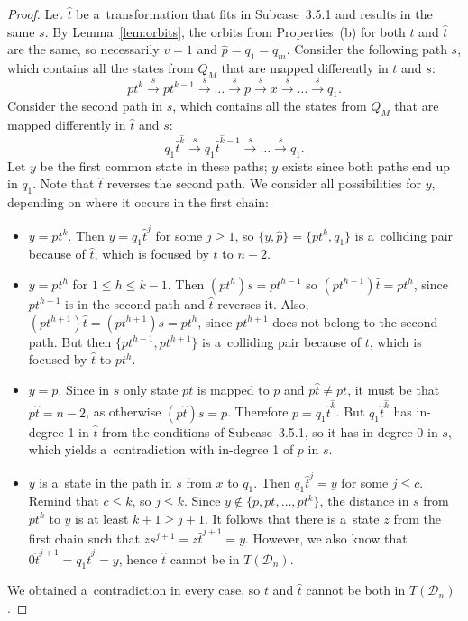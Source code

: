 \documentclass{amsart}
\renewcommand{\le}{\leqslant}
\renewcommand{\ge}{\geqslant}
\newcommand{\e}[1]{\hat{#1}}
\newcommand{\cD}{{\mathcal D}}
\begin{document}
\begin{proof}
Let $\e{t}$ be a~transformation that fits in Subcase~3.5.1 and results in the same $s$.
By Lemma~\ref{lem:orbits}, the orbits from Properties~(b) for both $t$ and $\e{t}$ are the same, so necessarily $v=1$ and $\e{p} = q_1 = q_m$.
Consider the following path $s$, which contains all the states from $Q_M$ that are mapped differently in $t$ and $s$:
$$p t^k \stackrel{s}{\rightarrow} p t^{k-1} \stackrel{s}{\rightarrow} \dots \stackrel{s}{\rightarrow} p \stackrel{s}{\rightarrow} x \stackrel{s}{\rightarrow} \dots \stackrel{s}{\rightarrow} q_1.$$
Consider the second path in $s$, which contains all the states from $Q_M$ that are mapped differently in $\e{t}$ and $s$:
$$q_1 \e{t}^{\e{k}} \stackrel{s}{\rightarrow} q_1 \e{t}^{\e{k}-1} \stackrel{s}{\rightarrow} \dots \stackrel{s}{\rightarrow} q_1.$$
Let $y$ be the first common state in these paths; $y$ exists since both paths end up in $q_1$.
Note that $\e{t}$ reverses the second path.
We consider all possibilities for $y$, depending on where it occurs in the first chain:
\begin{itemize}
\item $y = p t^k$.
Then $y = q_1 \e{t}^j$ for some $j \ge 1$, so $\{y,\e{p}\} = \{pt^k,q_1\}$ is a~colliding pair because of $\e{t}$, which is focused by $t$ to $n-2$.
\item $y = p t^h$ for $1 \le h \le k-1$.
Then $(p t^h) s = p t^{h-1}$ so $(p t^{h-1})\e{t} = p t^h$, since $pt^{h-1}$ is in the second path and $\e{t}$ reverses it.
Also, $(p t^{h+1})\e{t} = (p t^{h+1})s = p t^h$, since $p t^{h+1}$ does not belong to the second path.
But then $\{p t^{h-1},p t^{h+1}\}$ is a~colliding pair because of $t$, which is focused by $\e{t}$ to $pt^h$.
\item $y = p$.
Since in $s$ only state $pt$ is mapped to $p$ and $p\e{t} \neq pt$, it must be that $p\e{t} = n-2$, as otherwise $(p\e{t})s = p$.
Therefore $p = q_1 \e{t}^{\e{k}}$.
But $q_1 \e{t}^{\e{k}}$ has in-degree 1 in $\e{t}$ from the conditions of Subcase~3.5.1, so it has in-degree 0 in $s$, which yields a~contradiction with in-degree 1 of $p$ in $s$.
\item $y$ is a~state in the path in $s$ from $x$ to $q_1$.
Then $q_1 \e{t}^j = y$ for some $j \le c$.
Remind that $c \le k$, so $j \le k$.
Since $y \notin \{p,pt,\ldots,pt^k\}$, the distance in $s$ from $pt^k$ to $y$ is at least $k+1 \ge j+1$.
It follows that there is a~state $z$ from the first chain such that $z s^{j+1} = z \e{t}^{j+1} = y$.
However, we also know that $0\e{t}^{j+1} = q_1 \e{t}^j = y$, hence $\e{t}$ cannot be in $T(\cD_n)$.
\end{itemize}
We obtained a~contradiction in every case, so $t$ and $\e{t}$ cannot be both in $T(\cD_n)$.


\end{proof}
\end{document}
